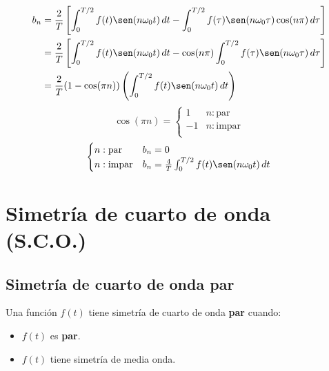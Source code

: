 \begin{equation*}
\begin{split}
    b_n
        &=\frac{2}{T}\left[
            \int_0^{T/2} f(t)\sen(n\omega_0 t)\,dt-
            \int_0^{T/2} f(\tau)\sen(n\omega_0\tau)\cos(n\pi)\,d\tau
        \right]\\
        &=\frac{2}{T}\left[
            \int_0^{T/2} f(t)\sen(n\omega_0 t)\,dt-
            \cos(n\pi)\int_0^{T/2} f(\tau)\sen(n\omega_0\tau)\,d\tau
        \right]\\
        &=\frac{2}{T}(1-\cos(\pi n))\left(
            \int_0^{T/2} f(t)\sen(n\omega_0 t)\,dt
        \right)\\
\end{split}
\end{equation*}
\begin{equation*}
    \cos(\pi n)=\begin{cases}
        1 &n: \text{par}\\
        -1 &n: \text{impar}\\
    \end{cases}
\end{equation*}
\begin{equation}
\begin{cases}
    n: \text{par}   &b_n=0\\
    n: \text{impar} &b_n=\frac{4}{T}\int_0^{T/2}f(t)\sen(n\omega_0 t)\,dt\\
\end{cases}
\end{equation}

\section{Simetría de cuarto de onda (S.C.O.)}

\subsection{Simetría de cuarto de onda par}
Una función $f(t)$ tiene simetría de cuarto de onda \textbf{par} cuando:

\begin{itemize}
    \item $f(t)$ es \textbf{par}.
    \item $f(t)$ tiene simetría de media onda.
\end{itemize}

\begin{figure}[H]
    \centering
    
\end{figure}

